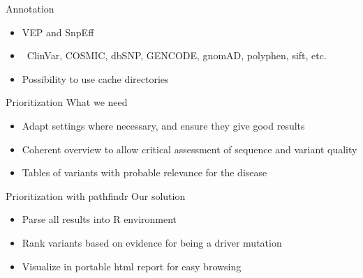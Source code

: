 \documentclass[usepdftitle=false]{beamer}
\begin{document}
\begin{frame}{Annotation}
	\begin{itemize}
		\item VEP and SnpEff
		\item \faDatabase\ ClinVar, COSMIC, dbSNP, GENCODE, gnomAD, polyphen, sift, etc.
		\pause
		\item Possibility to use cache directories
	\end{itemize}
\end{frame}

\begin{frame}{Prioritization}
	What we need
	\begin{itemize}
		\item<1-> Adapt settings where necessary, and ensure they give good results
		\item<2-> Coherent overview to allow critical assessment of sequence and variant quality
		\item<3-> Tables of variants with probable relevance for the disease
	\end{itemize}
\end{frame}

\begin{frame}{Prioritization with pathfindr}
	Our solution
	\begin{itemize}
		\item Parse all results into R environment
		\pause
		\item Rank variants based on evidence for being a driver mutation
		\pause
		\item Visualize in portable html report for easy browsing
	\end{itemize}
\end{frame}
\end{document}
